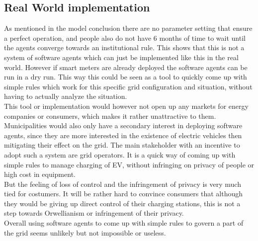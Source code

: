 \documentclass[a4paper]{article}
\begin{document}
\subsection{Real World implementation}
As mentioned in the model conclusion there are no parameter setting that ensure a perfect operation, and people also do not have 6 months
of time to wait until the agents converge towards an institutional rule. This shows that this is not a system of software agents which 
can just be implemented like this in the real world. However if smart meters are already deployed the software agents can be run in a dry 
run. This way this could be seen as a tool to quickly come up with simple rules which work for this specific grid configuration and 
situation, without having to actually analyze the situation. \\
This tool or implementation would however not open up any markets for energy companies or consumers, which makes it rather unattractive 
to them. Municipalities would also only have a secondary interest in deploying software agents, since they are more interested in the 
existence of electric vehicles then mitigating their effect on the grid. The main stakeholder with an incentive to adopt such a system 
are grid operators. It is a quick way of coming up with simple rules to manage charging of EV, without infringing on privacy of people
or high cost in equipment. \\
But the feeling of loss of control and the infringement of privacy is very much tied for costumers. It will be rather hard to convince 
consumers that although they would be giving up direct control of their charging stations, this is not a step towards Orwellianism or 
infringement of their privacy. \\
Overall using software agents to come up with simple rules to govern a part of the grid seems unlikely but not impossible or useless.
\end{document}
